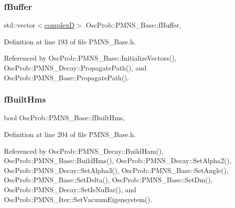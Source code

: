 \subsubsection{\texorpdfstring{f\+Buffer}{fBuffer}}
{\footnotesize\ttfamily std\+::vector$<$\hyperlink{EigenPoint_8h_a67ca8e107e20610c3fff78d5e726ece0}{complexD}$>$ Osc\+Prob\+::\+P\+M\+N\+S\+\_\+\+Base\+::f\+Buffer\hspace{0.3cm}{\ttfamily [protected]}, {\ttfamily [inherited]}}



Definition at line 193 of file P\+M\+N\+S\+\_\+\+Base.\+h.



Referenced by Osc\+Prob\+::\+P\+M\+N\+S\+\_\+\+Base\+::\+Initialize\+Vectors(), Osc\+Prob\+::\+P\+M\+N\+S\+\_\+\+Decay\+::\+Propagate\+Path(), and Osc\+Prob\+::\+P\+M\+N\+S\+\_\+\+Base\+::\+Propagate\+Path().

\mbox{\label{classOscProb_1_1PMNS__Base_a9ac3cadeac8db1b90f3152f476244780}} 
\subsubsection{\texorpdfstring{f\+Built\+Hms}{fBuiltHms}}
{\footnotesize\ttfamily bool Osc\+Prob\+::\+P\+M\+N\+S\+\_\+\+Base\+::f\+Built\+Hms\hspace{0.3cm}{\ttfamily [protected]}, {\ttfamily [inherited]}}



Definition at line 204 of file P\+M\+N\+S\+\_\+\+Base.\+h.



Referenced by Osc\+Prob\+::\+P\+M\+N\+S\+\_\+\+Decay\+::\+Build\+Ham(), Osc\+Prob\+::\+P\+M\+N\+S\+\_\+\+Base\+::\+Build\+Hms(), Osc\+Prob\+::\+P\+M\+N\+S\+\_\+\+Decay\+::\+Set\+Alpha2(), Osc\+Prob\+::\+P\+M\+N\+S\+\_\+\+Decay\+::\+Set\+Alpha3(), Osc\+Prob\+::\+P\+M\+N\+S\+\_\+\+Base\+::\+Set\+Angle(), Osc\+Prob\+::\+P\+M\+N\+S\+\_\+\+Base\+::\+Set\+Delta(), Osc\+Prob\+::\+P\+M\+N\+S\+\_\+\+Base\+::\+Set\+Dm(), Osc\+Prob\+::\+P\+M\+N\+S\+\_\+\+Decay\+::\+Set\+Is\+Nu\+Bar(), and Osc\+Prob\+::\+P\+M\+N\+S\+\_\+\+Iter\+::\+Set\+Vacuum\+Eigensystem().

\mbox{\label{classOscProb_1_1PMNS__Base_a0b4c41a27de281472453a1912cbc1e64}} 

